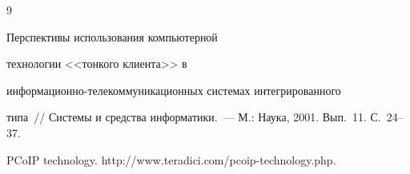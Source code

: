  {\small\frenchspacing


{%




\begin{thebibliography}{9}


   







 Перспективы использования компьютерной 


технологии <<тонкого клиента>> в 


ин\-фор\-ма\-ци\-он\-но-те\-ле\-ком\-му\-ни\-ка\-ци\-он\-ных системах интегрированного 


типа~/\!\!/ Системы и средства информатики.~--- М.: Наука, 2001. Вып.~11. С.~24--37.





 \label{end\stat}


 




PCoIP technology. {\sf http://www.teradici.com/pcoip-technology.php}.








 \end{thebibliography}


}


}


